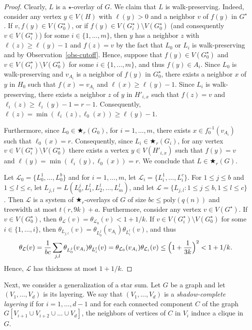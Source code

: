 \documentclass[a4paper,11pt]{article}
\newcommand{\LL}{{\mathcal L}}
\newcommand{\poly}{\text{poly}}
\begin{document}
\begin{proof}
Clearly, $L$ is a $\star$-overlay of $G$.  We claim that $L$ is walk-preserving.  Indeed, consider any vertex $y\in V(H)$ with $\ell(y)>0$ and a neighbor $v$ of $f(y)$ in $G^\star$.
If $v,f(y)\in V(G_0^\star)$, or if $f(y)\in V(G_i^\star)\setminus V(G_0^\star)$ (and consequently $v\in V(G_i^\star)$) for some $i\in\{1,\ldots, m\}$, then $y$ has a neighbor $z$ with $\ell(z)\ge \ell(y)-1$ and $f(z)=v$ by
the fact that $L_0$ or $L_i$ is walk-preserving and by Observation~\ref{obs-cutoff}.  Hence, suppose that $f(y)\in V(G_0^\star)$ and $v\in V(G_i^\star)\setminus V(G_0^\star)$
for some $i\in\{1,\ldots, m\}$, and thus $f(y)\in A_i$.  Since $L_0$ is walk-preserving and $v_{A_i}$ is a neighbor of $f(y)$ in $G_0^\star$, there exists a neighbor $x$ of $y$ in $H_0$
such that $f(x)=v_{A_i}$ and $\ell(x)\ge \ell(y)-1$.  Since $L_i$ is walk-preserving, there exists a neighbor $z$ of $y$ in $H'_{i,x}$ such that $f(z)=v$ and $\ell_i(z)\ge\ell_i(y)-1=r-1$.
Consequently, $\ell(z)=\min(\ell_i(z),\ell_0(x))\ge\ell(y)-1$.

Furthermore, since $L_0\in\bigstar_r(G_0)$, for $i=1,\ldots, m$, there exists $x\in f_0^{-1}(v_{A_i})$ such that $\ell_0(x)=r$.  Consequently, since $L_i\in \bigstar_r(G_i)$,
for any vertex $v\in V(G_i^\star)\setminus V(G_0^\star)$ there exists a vertex $y\in V(H'_{i,x})$ such that $f(y)=v$ and $\ell(y)=\min(\ell_i(y),\ell_0(x))=r$.
We conclude that $L\in\bigstar_r(G)$.

Let $\LL_0=\{L_0^1,\ldots,L_0^b\}$ and for $i=1,\ldots,m$, let $\LL_i=\{L_i^1,\ldots,L_i^c\}$. 
For $1\le j\le b$ and $1\le l\le c$, let $L_{j,l}=L(L_0^j,L_1^l,L_2^l,\ldots, L_m^l)$,
and let $\LL=\{L_{j,l}:1\le j\le b,1\le l\le c\}$.  Then $\LL$ is a system of $\bigstar_r$-overlays of $G$ of size $bc\le\poly(q(n))$ and treewidth at most $t(r,9k)+a$.
Furthermore, consider any vertex $v\in V(G^\star)$.  If $v\in V(G_0^\star)$, then $\theta_{\LL}(v)=\theta_{\LL_0}(v)<1+1/k$.
If $v\in V(G_i^\star)\setminus V(G_0^\star)$ for some $i\in \{1,\ldots, i\}$, then $\theta_{L_{j,l}}(v)=\theta_{L_0^j}(v_{A_i})\theta_{L_i^l}(v)$,
and thus
$$\theta_{\LL}(v)=\frac{1}{bc}\sum_{j,l}\theta_{L_0^j}(v_{A_i})\theta_{L_i^l}(v)=\theta_{\LL_0}(v_{A_i})\theta_{\LL_i}(v)\le \Bigl(1+\frac{1}{3k}\Bigr)^2<1+1/k.$$
Hence, $\LL$ has thickness at most $1+1/k$.
\end{proof}

Next, we consider a generalization of a star sum.
Let $G$ be a graph and let $(V_1,\ldots, V_d)$ is its layering. We say that $(V_1,\ldots, V_d)$ is a \emph{shadow-complete layering} if
for $i=1,\ldots, d-1$ and for each connected component $C$ of the graph $G[V_{i+1}\cup V_{i+2}\cup\ldots\cup V_d]$,
the neighbors of vertices of $C$ in $V_i$ induce a clique in $G$.  
\end{document}
